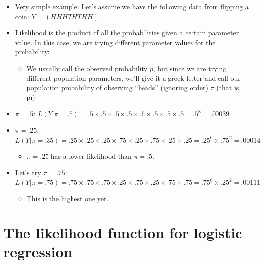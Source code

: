 \documentclass[]{article}
\begin{document}
\begin{itemize}
\itemsep1pt\parskip0pt
\item
  Very simple example: Let's assume we have the following data from
  flipping a coin: $Y = (H H H T H T H H)$
\item
  Likelihood is the product of all the probabilities given a certain
  parameter value. In this case, we are trying different parameter
  values for the probability:

  \begin{itemize}
  \itemsep1pt\parskip0pt
  \item
    We usually call the observed probability $p$, but since we are
    trying different population parameters, we'll give it a greek letter
    and call our population probability of observing ``heads'' (ignoring
    order) $\pi$ (that is, pi)
  \end{itemize}
\item
  $\pi = .5$:
  $L(Y|\pi = .5) = .5 \times .5 \times .5 \times .5 \times .5 \times .5 \times .5 \times .5 = .5^8 = .00039$
\item
  $\pi = .25$:
  $L(Y|\pi = .35) = .25 \times .25 \times .25 \times .75 \times .25 \times .75 \times .25 \times .25 = .25^6 \times .75^2 = .00014$

  \begin{itemize}
  \itemsep1pt\parskip0pt
  \item
    $\pi = .25$ has a lower likelihood than $\pi = .5$.
  \end{itemize}
\item
  Let's try $\pi = .75$:
  $L(Y|\pi = .75) = .75 \times .75 \times .75 \times .25 \times .75 \times .25 \times .75 \times .75 = .75^6 \times .25^2 = .00111$

  \begin{itemize}
  \itemsep1pt\parskip0pt
  \item
    This is the highest one yet.
  \end{itemize}
\end{itemize}

\section{The likelihood function for logistic
regression}\label{the-likelihood-function-for-logistic-regression}
\end{document}

